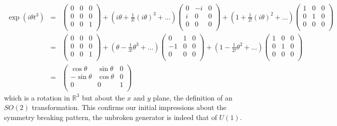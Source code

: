 \begin{eqnarray*}
    \exp(i\theta t^3) &=& \begin{pmatrix}
0 & 0 & 0\\
0 & 0 & 0\\
0 & 0 & 1\\
\end{pmatrix} + \left(i\theta + \frac{1}{3!}(i\theta)^3 + ...\right) \begin{pmatrix}
0 & -i & 0\\
i & 0 & 0\\
0 & 0 & 0\\
\end{pmatrix} + \left(1 + \frac{1}{2!}(i\theta)^2 + ...\right)\begin{pmatrix}
1 & 0 & 0\\
0 & 1 & 0\\
0 & 0 & 0\\
\end{pmatrix}\\
&=& \begin{pmatrix}
0 & 0 & 0\\
0 & 0 & 0\\
0 & 0 & 1\\
\end{pmatrix} + \left(\theta - \frac{1}{3!}\theta^3 + ...\right) \begin{pmatrix}
0 & 1 & 0\\
-1 & 0 & 0\\
0 & 0 & 0\\
\end{pmatrix} + \left(1 - \frac{1}{2!}\theta^2 + ...\right)\begin{pmatrix}
1 & 0 & 0\\
0 & 1 & 0\\
0 & 0 & 0\\
\end{pmatrix}\\
&=& \begin{pmatrix}
\cos\theta & \sin\theta & 0\\
-\sin\theta & \cos\theta & 0\\
0 & 0 & 1\\
\end{pmatrix} 
\end{eqnarray*}
which is a rotation in $\mathbb{R}^3$ but about the $x$ and $y$ plane, the definition of an $SO(2)$ transformation. This confirms our initial impressions about the symmetry breaking pattern, the unbroken generator is indeed that of $U(1)$. 
